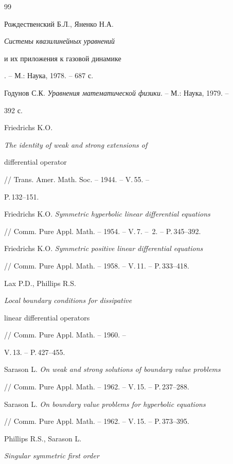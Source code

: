 \begin{thebibliography}{99}







Рождественский Б.Л., Яненко Н.А. {\it Системы квазилинейных уравнений


и их приложения к газовой динамике}. -- М.: Наука, 1978. -- 687 с.




Годунов С.К. {\it Уравнения математической физики}. -- М.: Наука, 1979. -- 


392 с.




Friedrichs K.O. {\it The identity of weak and strong extensions of


differential operator} // Trans. Amer. Math. Soc. -- 1944. -- V.\,55. --


P.\,132--151.




Friedrichs K.O. {\it Symmetric hyperbolic linear differential equations}


// Comm. Pure Appl. Math. -- 1954. -- V.\,7. -- \No\,2. -- P.\,345--392.




Friedrichs K.O. {\it Symmetric positive linear differential equations}


// Comm. Pure Appl. Math. -- 1958. -- V.\,11. -- P.\,333--418.




Lax P.D., Phillips R.S. {\it Local boundary conditions for dissipative 


linear differential operators} // Comm. Pure Appl. Math. -- 1960. --


V.\,13. -- P.\,427--455.




Sarason L. {\it On weak and strong solutions of boundary value problems}


// Comm. Pure Appl. Math. -- 1962. -- V.\,15. -- P.\,237--288.




Sarason L. {\it On boundary value problems for hyperbolic equations}


// Comm. Pure Appl. Math. -- 1962. -- V.\,15. -- P.\,373--395.




Phillips R.S., Sarason L. {\it Singular symmetric first order


}
\end{thebibliography}
